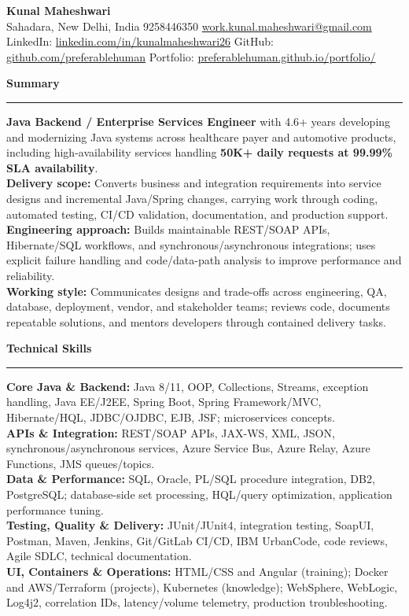 \documentclass[11pt,letterpaper]{article}
\newcommand{\ressection}[1]{\Needspace{6\baselineskip}\vspace{8pt}\par\textbf{#1}\par\vspace{2pt}\hrule\vspace{5pt}}
\begin{document}
\pagestyle{empty}\raggedright\fontsize{11}{12.5}\selectfont

{\Large \textbf{Kunal Maheshwari}}\\
Sahadara, New Delhi, India \textbar{} 9258446350 \textbar{} \href{mailto:work.kunal.maheshwari@gmail.com}{work.kunal.maheshwari@gmail.com}\\
LinkedIn: \href{https://www.linkedin.com/in/kunalmaheshwari26}{linkedin.com/in/kunalmaheshwari26} \textbar{} GitHub: \href{https://github.com/preferablehuman}{github.com/preferablehuman} \textbar{} Portfolio: \href{https://preferablehuman.github.io/portfolio/}{preferablehuman.github.io/portfolio/}

\ressection{Summary}
\textbf{Java Backend / Enterprise Services Engineer} with 4.6+ years developing and modernizing Java systems across healthcare payer and automotive products, including high-availability services handling \textbf{50K+ daily requests at 99.99\% SLA availability}.\\[2pt]
\textbf{Delivery scope:} Converts business and integration requirements into service designs and incremental Java/Spring changes, carrying work through coding, automated testing, CI/CD validation, documentation, and production support.\\[2pt]
\textbf{Engineering approach:} Builds maintainable REST/SOAP APIs, Hibernate/SQL workflows, and synchronous/asynchronous integrations; uses explicit failure handling and code/data-path analysis to improve performance and reliability.\\[2pt]
\textbf{Working style:} Communicates designs and trade-offs across engineering, QA, database, deployment, vendor, and stakeholder teams; reviews code, documents repeatable solutions, and mentors developers through contained delivery tasks.

\ressection{Technical Skills}
\textbf{Core Java \& Backend:} Java 8/11, OOP, Collections, Streams, exception handling, Java EE/J2EE, Spring Boot, Spring Framework/MVC, Hibernate/HQL, JDBC/OJDBC, EJB, JSF; microservices concepts.\\
\textbf{APIs \& Integration:} REST/SOAP APIs, JAX-WS, XML, JSON, synchronous/asynchronous services, Azure Service Bus, Azure Relay, Azure Functions, JMS queues/topics.\\
\textbf{Data \& Performance:} SQL, Oracle, PL/SQL procedure integration, DB2, PostgreSQL; database-side set processing, HQL/query optimization, application performance tuning.\\
\textbf{Testing, Quality \& Delivery:} JUnit/JUnit4, integration testing, SoapUI, Postman, Maven, Jenkins, Git/GitLab CI/CD, IBM UrbanCode, code reviews, Agile SDLC, technical documentation.\\
\textbf{UI, Containers \& Operations:} HTML/CSS and Angular (training); Docker and AWS/Terraform (projects), Kubernetes (knowledge); WebSphere, WebLogic, Log4j2, correlation IDs, latency/volume telemetry, production troubleshooting.
\end{document}

